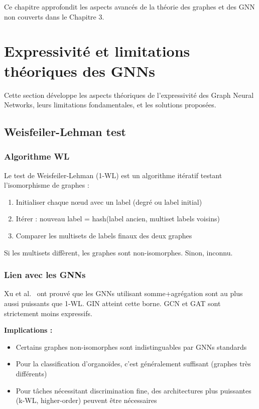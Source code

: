 Ce chapitre approfondit les aspects avancés de la théorie des graphes et des GNN non couverts dans le Chapitre 3.

\section{Expressivité et limitations théoriques des GNNs}

Cette section développe les aspects théoriques de l'expressivité des Graph Neural Networks, leurs limitations fondamentales, et les solutions proposées.

\subsection{Weisfeiler-Lehman test}

\subsubsection{Algorithme WL}

Le test de Weisfeiler-Lehman (1-WL) est un algorithme itératif testant l'isomorphisme de graphes :

\begin{enumerate}
    \item Initialiser chaque nœud avec un label (degré ou label initial)
    \item Itérer : nouveau label = hash(label ancien, multiset labels voisins)
    \item Comparer les multisets de labels finaux des deux graphes
\end{enumerate}

Si les multisets diffèrent, les graphes sont non-isomorphes. Sinon, inconnu.

\subsubsection{Lien avec les GNNs}

Xu et al.~\cite{Xu2019} ont prouvé que les GNNs utilisant somme+agrégation sont au plus aussi puissants que 1-WL. GIN atteint cette borne. GCN et GAT sont strictement moins expressifs.

\textbf{Implications :}
\begin{itemize}
    \item Certains graphes non-isomorphes sont indistinguables par GNNs standards
    \item Pour la classification d'organoïdes, c'est généralement suffisant (graphes très différents)
    \item Pour tâches nécessitant discrimination fine, des architectures plus puissantes (k-WL, higher-order) peuvent être nécessaires
\end{itemize}

